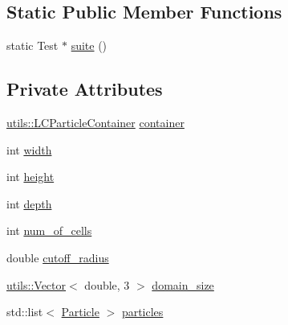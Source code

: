 \subsection*{Static Public Member Functions}
\begin{DoxyCompactItemize}
\item 
static Test $\ast$ \hyperlink{classLCParticleContainerTest_a38e97f8110510d564b91bdac41d9d9ca}{suite} ()
\end{DoxyCompactItemize}
\subsection*{Private Attributes}
\begin{DoxyCompactItemize}
\item 
\hyperlink{classutils_1_1LCParticleContainer}{utils\-::\-L\-C\-Particle\-Container} \hyperlink{classLCParticleContainerTest_aedb4bb8eb12e6079e1509ac1563c4022}{container}
\item 
int \hyperlink{classLCParticleContainerTest_a72378a90a56e81786578f90afcd41b39}{width}
\item 
int \hyperlink{classLCParticleContainerTest_a4699b4535369eb36b5d711e8b45f1da6}{height}
\item 
int \hyperlink{classLCParticleContainerTest_ab58d0d6496deca62a6452851aed96ef5}{depth}
\item 
int \hyperlink{classLCParticleContainerTest_a0d6b84232285d9630677586bb999a258}{num\-\_\-of\-\_\-cells}
\item 
double \hyperlink{classLCParticleContainerTest_a8489fd1951bb0c38acb2debd9cc5d447}{cutoff\-\_\-radius}
\item 
\hyperlink{classutils_1_1Vector}{utils\-::\-Vector}$<$ double, 3 $>$ \hyperlink{classLCParticleContainerTest_ab6450ef8318882ca6931be58e6ce58aa}{domain\-\_\-size}
\item 
std\-::list$<$ \hyperlink{classParticle}{Particle} $>$ \hyperlink{classLCParticleContainerTest_a9b0a10a86578860c76d2da5da0614e22}{particles}
\end{DoxyCompactItemize}


